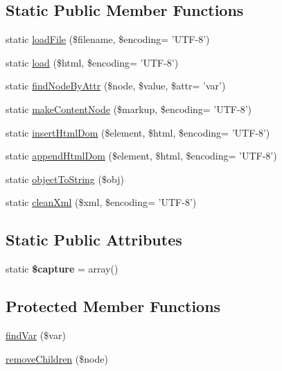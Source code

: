 \subsection*{Static Public Member Functions}
\begin{DoxyCompactItemize}
\item 
static \hyperlink{classDom_1_1Template_a75ea6e4a5f9b0ad7e604dff50dda43cd}{load\+File} (\$filename, \$encoding= 'U\+T\+F-\/8')
\item 
static \hyperlink{classDom_1_1Template_a3812d6c9e7cec651fb1e15371a45ac8b}{load} (\$html, \$encoding= 'U\+T\+F-\/8')
\item 
static \hyperlink{classDom_1_1Template_a2e44fe20cd9e638a5fe50eb2586c2544}{find\+Node\+By\+Attr} (\$node, \$value, \$attr= 'var')
\item 
static \hyperlink{classDom_1_1Template_a715e5867533ca289f0a429b642c806b3}{make\+Content\+Node} (\$markup, \$encoding= 'U\+T\+F-\/8')
\item 
static \hyperlink{classDom_1_1Template_a6de9e102ce6e66aaa47b01e4e7c59a17}{insert\+Html\+Dom} (\$element, \$html, \$encoding= 'U\+T\+F-\/8')
\item 
static \hyperlink{classDom_1_1Template_adeef221b4d09fdf9531ad8da3eaa3d17}{append\+Html\+Dom} (\$element, \$html, \$encoding= 'U\+T\+F-\/8')
\item 
static \hyperlink{classDom_1_1Template_af1fbd664d22c9b6dceac3fcb19e3f66d}{object\+To\+String} (\$obj)
\item 
static \hyperlink{classDom_1_1Template_acd1e69bdcd5316458218b07edf1afb91}{clean\+Xml} (\$xml, \$encoding= 'U\+T\+F-\/8')
\end{DoxyCompactItemize}
\subsection*{Static Public Attributes}
\begin{DoxyCompactItemize}
\item 
\hypertarget{classDom_1_1Template_aaa69a3f8a0f2b73ab30625e28ab11fec}{static {\bfseries \$capture} = array()}\label{classDom_1_1Template_aaa69a3f8a0f2b73ab30625e28ab11fec}

\end{DoxyCompactItemize}
\subsection*{Protected Member Functions}
\begin{DoxyCompactItemize}
\item 
\hyperlink{classDom_1_1Template_a499ec214aad64da669d94ee1c4516947}{find\+Var} (\$var)
\item 
\hyperlink{classDom_1_1Template_a6de5997030f9cdfb82281b66605d3472}{remove\+Children} (\$node)
\end{DoxyCompactItemize}
